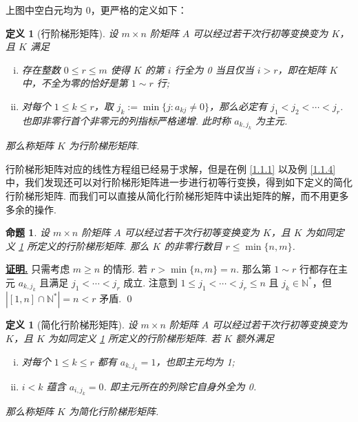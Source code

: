 \documentclass[10pt,openany]{article}
\theoremstyle{thmstyle} %
\theoremstyle{defstyle} %
\newtheorem{definition}[theorem]{定义}
\theoremstyle{prostyle} %
\newtheorem{proposition}[theorem]{命题}
\theoremstyle{exastyle}
\theoremstyle{remstyle}
\renewenvironment{proof}[1][证明]{\par\underline{\textbf{#1.}} \;\fangsong}{\qed\par}
\begin{document}
上图中空白元均为 0，更严格的定义如下：

\begin{definition}[行阶梯形矩阵]\label{1.1.5}
	设 \( m \times n \) 阶矩阵 \( A \) 可以经过若干次行初等变换变为 \( K \)，且 \( K \) 满足
	\begin{enumerate}[(i)]
		\item 存在整数 \( 0 \leq r \leq m \) 使得 \( K \) 的第 \( i \) 行全为 0 当且仅当 \( i>r \)，即在矩阵 \( K \) 中，不全为零的恰好是第 \( 1 \sim r \) 行;
		\item 对每个 \( 1 \leq k \leq r \)，取 \( j_k:=\min\{ j: a_{kj} \neq 0 \} \)，那么必定有 \( j_1<j_2<\cdots<j_r \). 也即非零行首个非零元的列指标严格递增. 此时称 \( a_{k,j_k} \) 为主元.
	\end{enumerate}
	
	那么称矩阵 \( K \) 为行阶梯形矩阵.

\end{definition}

行阶梯形矩阵对应的线性方程组已经易于求解，但是在例 \ref{1.1.1} 以及例 \ref{1.1.4} 中，我们发现还可以对行阶梯形矩阵进一步进行初等行变换，得到如下定义的简化行阶梯形矩阵. 而我们可以直接从简化行阶梯形矩阵中读出矩阵的解，而不用更多多余的操作.

\begin{proposition}
	设 \( m \times n \) 阶矩阵 \( A \) 可以经过若干次行初等变换变为 \( K \)，且 \( K \) 为如同定义 \ref{1.1.5} 所定义的行阶梯形矩阵. 那么 \( K \) 的非零行数目 \( r \leq \min\{n,m\} \).
\end{proposition}

\begin{proof}
	只需考虑 \( m \geq n \) 的情形. 若 \( r>\min\{n,m\}=n \). 那么第 \( 1 \sim r \) 行都存在主元 \( a_{k,j_k} \) 且满足 \( j_1<\cdots<j_r \) 成立. 注意到 \( 1 \leq j_1<\cdots<j_r \leq n \) 且 \( j_k \in \mathbb{N}^* \)，但 \( |[1,n] \cap \mathbb{N}^*|=n<r \) 矛盾.
\end{proof}

\begin{definition}[简化行阶梯形矩阵]
	设 \( m \times n \) 阶矩阵 \( A \) 可以经过若干次行初等变换变为 \( K \)，且 \( K \) 为如同定义 \ref{1.1.5} 所定义的行阶梯形矩阵. 若 \( K \) 额外满足
	\begin{enumerate}[(i)]
		\item 对每个 \( 1 \leq k \leq r \) 都有 \( a_{k,j_k}=1 \)，也即主元均为 1;
		\item \( i<k \) 蕴含 \( a_{i,j_k}=0 \). 即主元所在的列除它自身外全为 0.
	\end{enumerate}
	
	那么称矩阵 \( K \) 为简化行阶梯形矩阵.
\end{definition}
\end{document}
